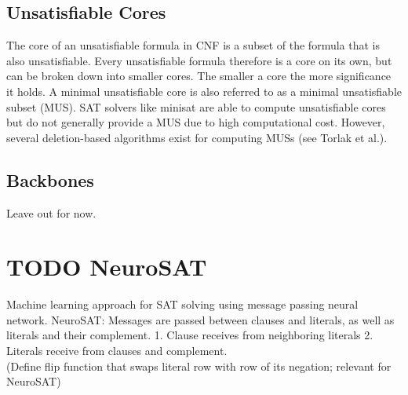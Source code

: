 
\subsection{Unsatisfiable Cores}
The core of an unsatisfiable formula in CNF is a subset of the formula that is also unsatisfiable. Every unsatisfiable formula therefore is a core on its own, but can be broken down into smaller cores. The smaller a core the more significance it holds. A minimal unsatisfiable core is also referred to as a minimal unsatisfiable subset (MUS). SAT solvers like minisat\cite{een2003extensible} are able to compute unsatisfiable cores but do not generally provide a MUS due to high computational cost. However, several deletion-based algorithms exist for computing MUSs (see Torlak et al.\cite{10.1007/978-3-540-68237-0_23}).

\subsection{Backbones}
Leave out for now.

\section{TODO NeuroSAT}
Machine learning approach for SAT solving using message passing neural network.
NeuroSAT\cite{selsam2018learning}: Messages are passed between clauses and literals, as well as literals and their complement. 1. Clause receives from neighboring literals 2. Literals receive from clauses and complement. \\
(Define flip function that swaps literal row with row of its negation; relevant for NeuroSAT)